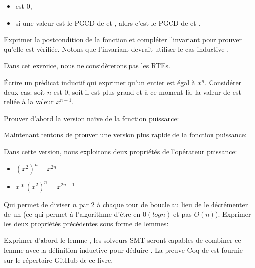 \begin{itemize}
\item {} est 0,
\item si une valeur  est le PGCD de  et ,
      alors c'est le PGCD de  et .
\end{itemize}




Exprimer la postcondition de la fonction et compléter l'invariant pour prouver
qu'elle est vérifiée. Notons que l'invariant devrait utiliser le cas inductive
.





Dans cet exercice, nous ne considèrerons pas les RTEs.


Écrire un prédicat inductif qui exprimer qu'un entier  est égal
à $x^n$. Considérer deux cas: soit $n$ est 0, soit il est plus grand et à ce moment
là, la valeur de  est reliée à la valeur $x^{n-1}$.




Prouver d'abord la version naïve de la fonction puissance:




Maintenant tentons de prouver une version plus rapide de la fonction puissance:




Dans cette version, nous exploitons deux propriétés de l'opérateur puissance:


\begin{itemize}
\item $(x^2)^n = x^{2n}$
\item $x * (x^2)^n = x^{2n+1}$
\end{itemize}


Qui permet de diviser $n$ par 2 à chaque tour de boucle au lieu de le décrémenter
de un (ce qui permet à l'algorithme d'être en $0(log n)$ et pas $O(n)$). Exprimer
les deux propriétés précédentes sous forme de lemmes:




Exprimer d'abord le lemme , les solveurs SMT seront capables
de combiner ce lemme avec la définition inductive pour déduire .
La preuve Coq de  est fournie sur le répertoire GitHub de ce
livre.


